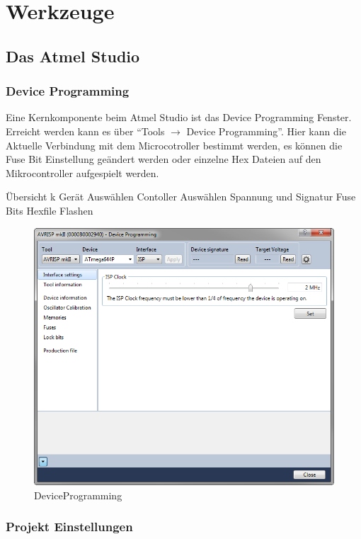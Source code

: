 \section{Werkzeuge}

\subsection{Das Atmel Studio}

\subsubsection{Device Programming}

Eine Kernkomponente beim Atmel Studio ist das Device Programming Fenster.
Erreicht werden kann es über "`Tools $\to$  Device Programming"'.
Hier kann die Aktuelle Verbindung mit dem Microcotroller bestimmt werden, es
können die Fuse Bit Einstellung geändert werden oder einzelne Hex
Dateien auf den Mikrocontroller aufgespielt werden.



Übersicht k Gerät Auswählen
Contoller Auswählen
Spannung und Signatur
Fuse Bits
Hexfile Flashen

\begin{figure}[h]
\centering
\includegraphics[width=13cm]{content/pictures/Anleitung/neuerProzessor/AnleitungNeuerProzessor1.png}
\caption{DeviceProgramming}
\label{fig:B3}
\end{figure}

\subsubsection{Projekt Einstellungen}

